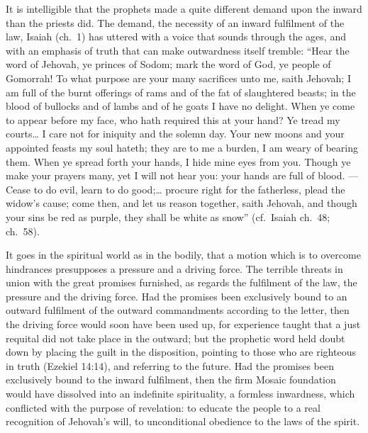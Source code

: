 \documentclass[12pt,a4paper,openany]{book}
\newcommand{\opage}[1]{\marginnote{\footnotesize\textit{[#1]}}}
\begin{document}
It is intelligible that the prophets made a quite
different demand upon the inward than the priests did. The demand,
the necessity of an inward fulfilment of the law,
Isaiah (ch.~1) has uttered with a voice that sounds
through the ages, and with an emphasis of truth
that can make outwardness itself tremble: ``Hear
\setcounter{footnote}{0}%
\opage{51}the word of Jehovah, ye princes of Sodom; mark the word of God, ye
people of Gomorrah! To what purpose are your many
sacrifices unto me, saith Jehovah; I am full of the burnt offerings of rams
and of the fat of slaughtered beasts; in the blood of bullocks and of lambs
and of he goats I have no delight. When ye come to
appear before my face, who hath required this at your
hand? Ye tread my courts\dots{} I
care not for iniquity and the solemn day. Your new moons
and your appointed feasts my soul hateth; they are to me
a burden, I am weary of bearing them. When ye spread forth
your hands, I hide mine eyes from you.
Though ye make your prayers many, yet I will
not hear you: your hands are full of blood. ---
Cease to do evil, learn to do good;\dots{} procure
right for the fatherless, plead the widow's cause; come then,
and let us reason together, saith Jehovah,
and though your sins be red as purple,
they shall be white as snow'' (cf.~Isaiah ch.~48;
ch.~58).

It goes in the spiritual world as in the
bodily, that a motion which is to overcome hindrances
presupposes a pressure and a driving force. The terrible
threats in union with the great promises
furnished, as regards the fulfilment of the law, the pressure and the driving force.
Had the promises been exclusively
bound to an outward fulfilment of the outward commandments
according to the letter, then the driving force would soon have been used up,
for experience taught that a just requital
did not take place in the outward; but the prophetic
word held doubt down by placing the guilt
in the disposition, pointing to those who are righteous in truth
(Ezekiel 14:14), and referring to the future. Had
\setcounter{footnote}{0}%
\opage{52}the promises been exclusively bound to the inward
fulfilment, then the firm Mosaic foundation would
have dissolved into an indefinite spirituality, a
formless inwardness, which conflicted with the purpose of revelation: to educate the people to a real recognition
of Jehovah's will, to unconditional obedience to the laws
of the spirit.
\end{document}
